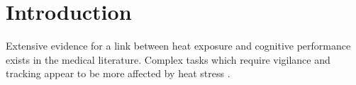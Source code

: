 
\section{Introduction}

Extensive evidence for a link between heat exposure and cognitive performance exists in the medical literature. Complex tasks which require vigilance and tracking appear to be more affected by heat stress \citep{Hancock_2003}.